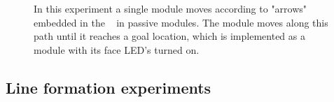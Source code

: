 \begin{figure}[h]
\begin{subfigure}[b]{0.30\linewidth}
	\end{subfigure}
	\caption{In this experiment a single module moves according to "arrows" embedded in the \tagNamePlural~ in passive modules. The module moves along this path until it reaches a goal location, which is implemented as a module with its face LED's turned on.}
	
	\label{fig:arrowExperiment}
\end{figure}

\subsection{Line formation experiments}
\label{sec:mblocksExperimentsLine}

